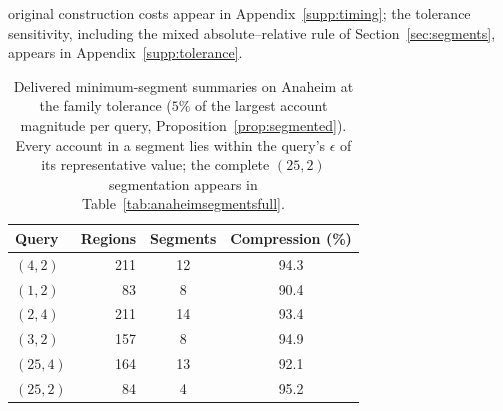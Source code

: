 original construction costs appear in Appendix~\ref{supp:timing}; the
tolerance sensitivity, including the mixed absolute--relative rule of
Section~\ref{sec:segments}, appears in
Appendix~\ref{supp:tolerance}.
\begin{table}[t]\centering\footnotesize
\caption{Delivered minimum-segment summaries on Anaheim at the family
tolerance ($5\%$ of the largest account magnitude per query,
Proposition~\ref{prop:segmented}). Every account in a segment lies
within the query's $\epsilon$ of its representative value; the complete
$(25,2)$ segmentation appears in
Table~\ref{tab:anaheimsegmentsfull}.}\label{tab:anaheimsegments}
\setlength{\tabcolsep}{4pt}
\begin{tabular*}{\tblwidth}{@{\extracolsep{\fill}}lrcc}
\toprule
Query & Regions & Segments & Compression (\%)\\
\midrule
$(4,2)$ & 211 & 12 & 94.3\\
$(1,2)$ & 83 & 8 & 90.4\\
$(2,4)$ & 211 & 14 & 93.4\\
$(3,2)$ & 157 & 8 & 94.9\\
$(25,4)$ & 164 & 13 & 92.1\\
$(25,2)$ & 84 & 4 & 95.2\\
\bottomrule\end{tabular*}\end{table}
